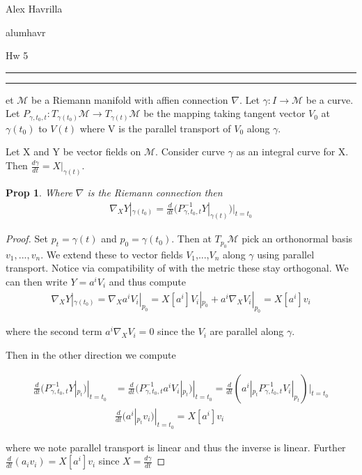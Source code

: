 \documentclass[11pt]{article}
\newcommand{\m}{\mathcal{M}}
\newcommand{\question}[2] {\vspace{.25in} \hrule\vspace{0.5em}
\noindent{\bf #1: #2} \vspace{0.5em}
\hrule \vspace{.10in}}
\newcommand{\myname}{Alex Havrilla}
\newcommand{\myandrew}{alumhavr}
\newcommand{\myhwnum}{Hw 5}
\newtheorem{prop}{Prop}
\begin{document}
\medskip                        

\thispagestyle{plain}
\begin{center}

{\myname}

\myandrew

\myhwnum

\end{center}

\question{Question 1}

Let $\m$ be a Riemann manifold with affien connection $\nabla$. Let $\gamma : I \to \m$ be a curve. Let $P_{\gamma,t_0,t} : T_{\gamma(t_0)} \m \to T_{\gamma(t)} \m$ be the mapping taking tangent vector $V_0$ at $\gamma(t_0)$ to $V(t)$ where V is the parallel transport of $V_0$ along $\gamma$. 

Let X and Y be vector fields on $\m$. Consider curve $\gamma$ as an integral curve for X. Then $\frac{d \gamma}{d t} = X|_{\gamma(t)}$.

\begin{prop}
Where $\nabla$ is the Riemann connection then
	\begin{align*}
		\nabla_X Y |_{\gamma(t_0)} = \frac{d}{dt}(P^{-1}_{\gamma,t_0,t}Y|_{\gamma(t)}) | _{t = t_0}
	\end{align*}
\end{prop}

\begin{proof}
	Set $p_t = \gamma(t)$ and $p_0 = \gamma(t_0)$. Then at $T_{p_0}\m$ pick an orthonormal basis $v_1,...,v_n$. We extend these to vector fields $V_1$,...,$V_n$ along $\gamma$ using parallel transport. Notice via compatibility of with the metric these stay orthogonal. We can then write $Y = a^iV_i$ and thus compute
	\begin{align*}
		\nabla_X Y|_{\gamma(t_0)} = \nabla_X a^iV_i|_{p_0} = X[a^i]V_i|_{p_0} + a^i \nabla_X V_i |_{p_0}= X[a^i]v_i
	\end{align*}

	where the second term $a^i \nabla_X V_i = 0$ since the $V_i$ are parallel along $\gamma$.


	Then in the other direction we compute
	
	\begin{align*}
		\frac{d}{dt}(P^{-1}_{\gamma,t_0,t}Y|_{p_t})|_{t=t_0} &= \frac{d}{dt}(P^{-1}_{\gamma,t_0,t}a^iV_i|_{p_t})|_{t=t_0} = \frac{d}{dt}(a^i|_{p_t}P^{-1}_{\gamma,t_0,t}V_i|_{p_t})|_{t=t_0} \\
		& \frac{d}{dt}(a^i|_{p_t}v_i)|_{t=t_0} =  X[a^i]v_i
	\end{align*}

	where we note parallel transport is linear and thus the inverse is linear. Further $\frac{d}{dt}(a_i v_i) = X[a^i]v_i$ since $X = \frac{d \gamma}{dt}$
\end{proof}
\end{document}
